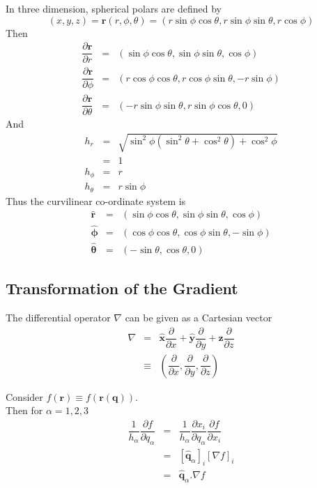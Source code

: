 \documentclass[11pt,a4paper]{article}
\begin{document}
In three dimension, spherical polars are defined by
$$(x,y,z)=\textbf{r}(r,\phi,\theta)=(r\sin\phi\cos\theta,r\sin\phi\sin\theta, r\cos\phi)$$
Then
\[\begin{array}{rcl}
\dfrac{\partial\textbf{r}}{\partial r}&=&(\sin\phi\cos\theta,\sin\phi\sin\theta,\cos\phi)\\
\dfrac{\partial\textbf{r}}{\partial \phi}&=&(r\cos\phi\cos\theta,r\cos\phi\sin\theta,-r\sin\phi)\\
\dfrac{\partial\textbf{r}}{\partial \theta}&=&(-r\sin\phi\sin\theta, r\sin\phi\cos\theta, 0)
\end{array}\]
And
\[\begin{array}{rcl}
h_r&=&\sqrt{\sin^2\phi(\sin^2\theta+\cos^2\theta)+\cos^2\phi}\\
&=&1\\
h_\phi&=&r\\
h_\theta&=&r\sin\phi
\end{array}\]
Thus the curvilinear co-ordinate system is
\[\begin{array}{rcl}
\hat{\textbf{r}}&=&(\sin\phi\cos\theta,\sin\phi\sin\theta,\cos\phi)\\
\hat{\pmb{\phi}}&=&(\cos\phi\cos\theta,\cos\phi\sin\theta,-\sin\phi)\\
\hat{\pmb{\theta}}&=&(-\sin\theta, \cos\theta,0)
\end{array}\]

\subsection{Transformation of the Gradient}

The differential operator $\nabla$ can be given as a Cartesian vector
\[\begin{array}{rcl}
\nabla&=&\hat{\textbf{x}}\dfrac{\partial}{\partial x}+\hat{\textbf{y}}\dfrac{\partial}{\partial y}+\hat{\textbf{z}}\dfrac{\partial}{\partial z}\\
&\equiv&\left(\dfrac{\partial}{\partial x}, \dfrac{\partial}{\partial y}, \dfrac{\partial}{\partial z}\right)
\end{array}\]

Consider $f(\textbf{r})\equiv f(\textbf{r}(\textbf{q}))$.\\
Then for $\alpha=1,2,3$
\[\begin{array}{rcl}
\dfrac{1}{h_\alpha}\dfrac{\partial f}{\partial q_\alpha}&=&\dfrac{1}{h_\alpha}\dfrac{\partial x_i}{\partial q_\alpha}\dfrac{\partial f}{\partial x_i}\\
&=&[\hat{\textbf{q}}_\alpha]_i[\nabla f]_i\\
&=&\hat{\textbf{q}}_\alpha.\nabla f
\end{array}\]
\end{document}
